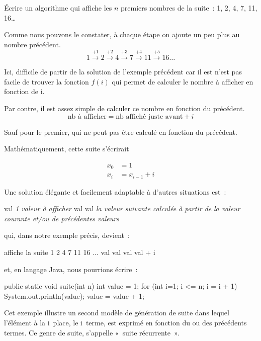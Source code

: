 		Écrire un algorithme qui affiche les $n$ premiers nombres de la suite~:
		1, 2, 4, 7, 11, 16\dots{}
		
		Comme nous pouvons le constater, 
		à chaque étape on ajoute un peu plus au nombre précédent.
		\[ 
			1 
			\xrightarrow{+1} 2 
			\xrightarrow{+2} 4
			\xrightarrow{+3} 7 
			\xrightarrow{+4} 11 
			\xrightarrow{+5} 16 
			\dots
		\] 

		Ici, difficile de partir de la solution de l’exemple précédent car il
		est n’est pas facile de trouver la fonction $f(i)$ qui permet de
		calculer le nombre à afficher en fonction de i. 
		
		Par contre, il est assez simple de calculer ce nombre 
		en fonction du précédent.
		\[
			\mbox{nb à afficher} = \mbox{nb affiché juste avant} + i
		\]
		
		Sauf pour le premier, qui ne peut pas être calculé en fonction du
		précédent.

		Mathématiquement, cette suite s'écrirait

		\begin{align*}
			x_0 &= 1\\
			x_i &= x_{i-1} + i
		\end{align*}


		Une solution élégante et facilement adaptable à d’autres situations
		est~:
		
		\begin{pseudocode}
				\Let val \Gets \textit{1\iere{} valeur à afficher}
					\Write val
					\Let val \Gets \textit{la valeur suivante calculée à partir de}
					\Let\Indent \textit{la valeur courante et/ou de précédentes valeurs}
				\EndFor
			\EndAlgo
		\end{pseudocode}
		
		qui, dans notre exemple précis, devient~:

		\begin{pseudocode}
			\LComment affiche la suite 1 2 4 7 11 16 ...
			\Algo{suite}{\Par{n}{integer}}{}
				\Decl{val}{integer}
				\Let val \Gets 1
				\For{i}{1}{n}
					\Write val
					\Let val \Gets val + i
				\EndFor
			\EndAlgo
		\end{pseudocode}

		et, en langage Java, nous pourrions écrire~:

		\begin{java}
public static void suite(int n){
	int value = 1;
	for (int i=1; i <= n; i = i + 1){
		System.out.println(value);
		value = value + 1;
	}
}
		\end{java}

		Cet exemple illustre un second modèle de génération de suite dans lequel
		l'élément à la i\ieme\ place, le i\ieme\ terme, est exprimé en fonction
		du ou des précédents termes. Ce genre de suite, s'appelle  «~suite
		récurrente~». 
                     
